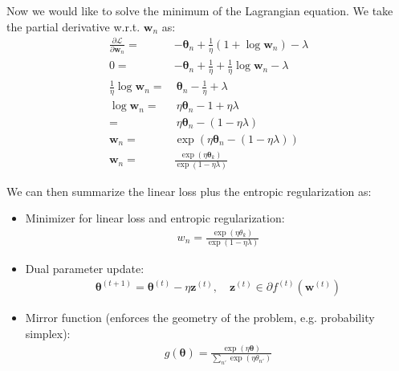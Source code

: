 \documentclass[11pt]{article}
\newcommand{\btheta}{\boldsymbol{\theta}}
\newcommand{\bz}{\boldsymbol{z}}
\newcommand{\bw}{\boldsymbol{w}}
\begin{document}
Now we would like to solve the minimum of the Lagrangian equation. We take the partial derivative w.r.t. $\bw_n$ as:
\begin{align}\label{eq:lag}
    \frac{\partial \mathcal{L}}{\partial \bw_n} = & -\btheta_n + \frac{1}{\eta} (1 + \log \bw_n) - \lambda \nonumber \\
    0 = & -\btheta_n + \frac{1}{\eta} + \frac{1}{\eta} \log \bw_n - \lambda\nonumber \\
    \frac{1}{\eta} \log \bw_n= & ~ \btheta_n - \frac{1}{\eta} + \lambda\nonumber\\
    \log \bw_n = & ~ \eta \btheta_n -1 + \eta \lambda\nonumber\\
    = & ~ \eta \btheta_n - (1 - \eta \lambda)\nonumber\\
    \bw_n = & \exp (\eta \btheta_n - (1 - \eta \lambda\nonumber))\\
    \bw_n = & \frac{\exp (\eta \btheta_k)}{\exp (1-\eta \lambda)}
\end{align}

We can then summarize the linear loss plus the entropic regularization as:
\begin{itemize}
    \item Minimizer for linear loss and entropic regularization:
    \begin{equation*}
    \begin{split}
    w_n = \frac{\exp(\eta\theta_k)}{\exp(1-\eta\lambda)}
    \end{split}
    \end{equation*}
    \item Dual parameter update:
    \begin{equation*}
    \begin{split}
    \btheta^{(t+1)} = \btheta^{(t)} - \eta\bz^{(t)}, \quad \bz^{(t)} \in \partial f^{(t)}(\bw^{(t)})
    \end{split}
    \end{equation*}
    \item Mirror function (enforces the geometry of the problem, e.g. probability simplex):
    \begin{equation*}
    \begin{split}
    g(\btheta) = \frac{\exp(\eta\btheta)}{\sum_{n'}\exp(\eta\theta_{n'})}
    \end{split}
    \end{equation*}
\end{itemize}

\end{document}
